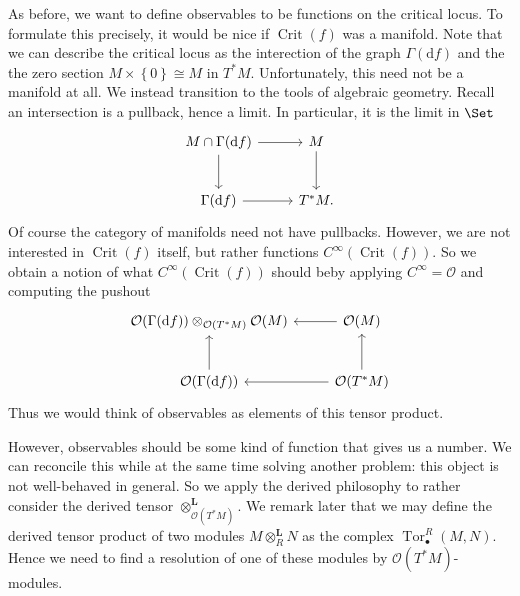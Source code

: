 As before, we want to define observables to be functions on the critical locus. To formulate this precisely, it would be nice if $\operatorname{Crit} (f)$ was a manifold. Note that we can describe the critical locus as the interection of the graph $\Gamma (\mathrm{d} f)$ and the the zero section $M\times \left\{ 0 \right\} \cong M$ in $T^*M$. Unfortunately, this need not be a manifold at all. We instead transition to the tools of algebraic geometry. Recall an intersection is a pullback, hence a limit. In particular, it is the limit in $\Set $
\[\begin{tikzcd}[row sep = 2.5em, column sep = 2.5em]
M \cap \Gamma (\mathrm{d} f)\ar[r] \ar[d]  & M\ar[d]  \\
\Gamma (\mathrm{d} f)\ar[r]  & T^*M.
\end{tikzcd}\]
Of course the category of manifolds need not have pullbacks. However, we are not interested in $\operatorname{Crit} (f)$ itself, but rather functions $C^\infty (\operatorname{Crit} (f))$. So we obtain a notion of what $C^\infty (\operatorname{Crit} (f))$ should beby applying $C^\infty =\mathcal{O} $ and computing the pushout
\[\begin{tikzcd}[row sep = 2.5em, column sep = 2.5em]
\mathcal{O} (\Gamma (\mathrm{d} f))\otimes_{\mathcal{O} (T^*M)} \mathcal{O} (M) & \mathcal{O} (M)\ar[l]  \\
\mathcal{O} (\Gamma (\mathrm{d} f))\ar[u]  & \mathcal{O} (T^*M)\ar[u] \ar[l] 
\end{tikzcd}\]
Thus we would think of observables as elements of this tensor product.

However, observables should be some kind of function that gives us a number. We can reconcile this while at the same time solving another problem: this object is not well-behaved in general. So we apply the derived philosophy to rather consider the derived tensor $\otimes^{\mathbf{L} }_{\mathcal{O} (T^*M)} $. We remark later that we may define the derived tensor product of two modules $M\otimes_R^{\mathbf{L} } N$ as the complex $\operatorname{Tor}_{\bullet} ^R(M,N)$. Hence we need to find a resolution of one of these modules by $\mathcal{O} (T^*M)$-modules.

